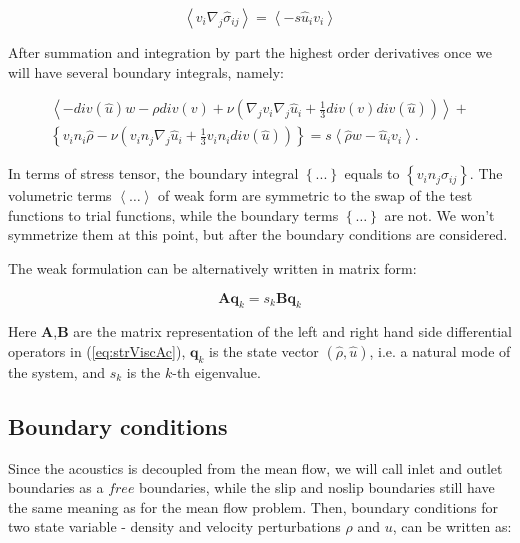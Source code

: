 \begin{equation}
        \left< v_i \nabla_j \hat{\sigma}_{ij} \right>= \left<- s \hat{u}_i v_i\right>
\end{equation}


After summation and integration by part the highest order derivatives once we will have several boundary integrals, namely:

\begin{subequations}
\label{eq:AcousGenerWeak}
\begin{align}
    \left< - div(\hat{u}) w  - \rho div(v)  + \nu \left(\nabla_j v_i \nabla_j \hat{u}_i + \frac{1}{3} div(v) div(\hat{u}) \right) \right>  + \\
    \left\{ v_i n_i \hat{\rho}  - \nu \left( v_i n_j \nabla_j \hat{u}_i + \frac{1}{3} v_i n_i div(\hat{u}) \right) \right\} = s \left< \hat{\rho} w - \hat{u}_i v_i \right>.
\end{align}
\end{subequations}

In terms of stress tensor, the boundary integral $\left\{ ... \right\}$ equals to $\left\{ v_i n_j \hat{\sigma}_{ij} \right\}$. The volumetric terms $\left<\dots\right>$ of weak form are symmetric to the swap of the test functions to trial functions, while the boundary terms $\left\{\dots\right\}$ are not. We won't symmetrize them at this point, but after the boundary conditions are considered.

The weak formulation can be alternatively written in matrix form:

\begin{equation}
    \mathbf{A}\mathbf{q}_k = s_k \mathbf{B}\mathbf{q}_k
\end{equation}

Here \textbf{A},\textbf{B} are the matrix representation of the left and right  hand  side  differential  operators in (\ref{eq:strViscAc}),  $\mathbf{q}_k$ is the state vector $(\hat{\rho}, \hat{u})$, i.e. a natural mode of the system, and $s_k$ is  the $k$-th eigenvalue. 

\subsection{Boundary conditions}

Since the acoustics is decoupled from the mean flow, we will call inlet and outlet boundaries as a $free$ boundaries, while the slip and noslip boundaries still have the same meaning as for the mean flow problem. Then, boundary conditions for two state variable - density and velocity perturbations $\rho$ and $u$, can be written as:

